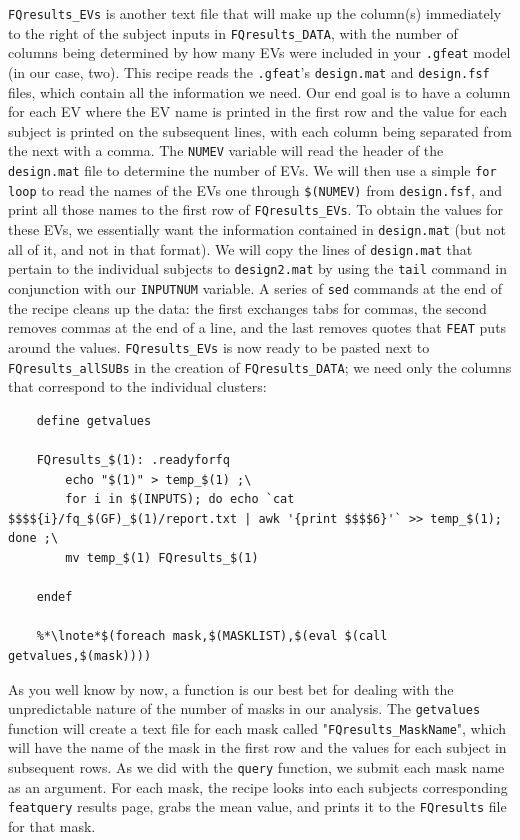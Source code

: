\texttt{FQresults_EVs} is another text file that will make up the column(s) immediately to the right of the subject inputs in \texttt{FQresults_DATA}, with the number of columns being determined by how many EVs were included in your \texttt{.gfeat} model (in our case, two). This recipe reads the \texttt{.gfeat}'s \texttt{design.mat} and \texttt{design.fsf} files, which contain all the information we need. Our end goal is to have a column for each EV where the EV name is printed in the first row and the value for each subject is printed on the subsequent lines, with each column being separated from the next with a comma. The \texttt{NUMEV} variable will read the header of the \texttt{design.mat} file to determine the number of EVs.  We will then use a simple \texttt{for loop} to read the names of the EVs one through \texttt{\$(NUMEV)} from \texttt{design.fsf}, and print all those names to the first row of \texttt{FQresults_EVs}. To obtain the values for these EVs, we essentially want the information contained in \texttt{design.mat} (but not all of it, and not in that format). We will copy the lines of \texttt{design.mat} that pertain to the individual subjects to \texttt{design2.mat} by using the \texttt{tail} command in conjunction with our \texttt{INPUTNUM} variable. A series of \texttt{sed} commands at the end of the recipe cleans up the data: the first exchanges tabs for commas, the second removes commas at the end of a line, and the last removes quotes that \texttt{FEAT} puts around the values. \texttt{FQresults_EVs} is now ready to be pasted next to \texttt{FQresults_allSUBs} in the creation of \texttt{FQresults_DATA}; we need only the columns that correspond to the individual clusters:
\begin{lstlisting}
	define getvalues
	
	FQresults_$(1): .readyforfq
		echo "$(1)" > temp_$(1) ;\
		for i in $(INPUTS); do echo `cat $$$${i}/fq_$(GF)_$(1)/report.txt | awk '{print $$$$6}'` >> temp_$(1); done ;\
		mv temp_$(1) FQresults_$(1)
		
	endef
	
	%*\lnote*$(foreach mask,$(MASKLIST),$(eval $(call getvalues,$(mask))))
\end{lstlisting}

As you well know by now, a function is our best bet for dealing with the unpredictable nature of the number of masks in our analysis. The \texttt{getvalues} function will create a text file for each mask called "\texttt{FQresults_MaskName}", which will have the name of the mask in the first row and the values for each subject in subsequent rows. As we did with the \texttt{query} function, we submit each mask name as an argument. For each mask, the recipe looks into each subjects corresponding \texttt{featquery} results page, grabs the mean value, and prints it to the \texttt{FQresults} file for that mask.

